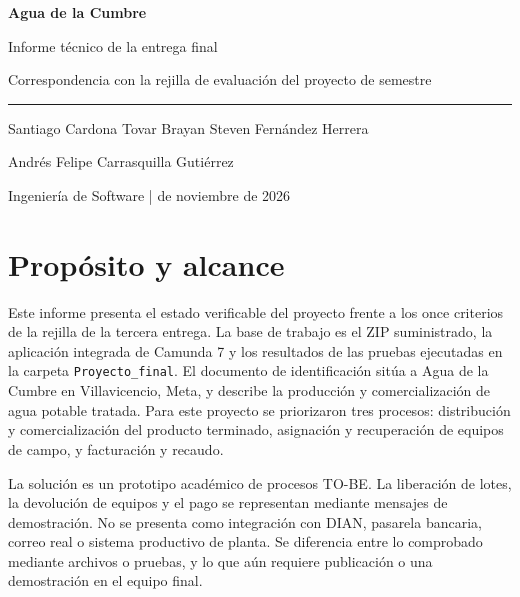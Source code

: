 \documentclass[11pt,letterpaper]{article}
\newcommand{\ruta}[1]{\nolinkurl{#1}}
\begin{document}
\begin{center}
{\Large\bfseries\color{azul} Agua de la Cumbre}\par
\vspace{5pt}
{\LARGE Informe técnico de la entrega final}\par
\vspace{5pt}
{\large Correspondencia con la rejilla de evaluación del proyecto de semestre}\par
\vspace{12pt}
\rule{0.86\textwidth}{0.6pt}\par
\vspace{8pt}
Santiago Cardona Tovar \quad\textbullet\quad Brayan Steven Fernández Herrera\par
Andrés Felipe Carrasquilla Gutiérrez\par
\vspace{4pt}
Ingeniería de Software \quad |  de noviembre de 2026
\end{center}

\section*{Propósito y alcance}
Este informe presenta el estado verificable del proyecto frente a los once criterios de la rejilla de la tercera entrega. La base de trabajo es el ZIP suministrado, la aplicación integrada de Camunda 7 y los resultados de las pruebas ejecutadas en la carpeta \ruta{Proyecto_final}. El documento de identificación sitúa a Agua de la Cumbre en Villavicencio, Meta, y describe la producción y comercialización de agua potable tratada. Para este proyecto se priorizaron tres procesos: distribución y comercialización del producto terminado, asignación y recuperación de equipos de campo, y facturación y recaudo.

La solución es un prototipo académico de procesos TO-BE. La liberación de lotes, la devolución de equipos y el pago se representan mediante mensajes de demostración. No se presenta como integración con DIAN, pasarela bancaria, correo real o sistema productivo de planta. Se diferencia entre lo comprobado mediante archivos o pruebas, y lo que aún requiere publicación o una demostración en el equipo final.
\end{document}
